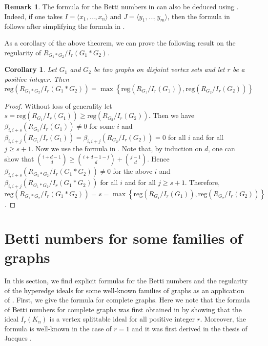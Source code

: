 \documentclass[12pt,reqno]{amsart}
\newtheorem{corollary}[proposition]{Corollary}
\theoremstyle{definition}
\newtheorem{remark}[proposition]{Remark}
\begin{document}
\begin{remark}
    The formula for the Betti numbers in  can also be deduced using \cite[Corollary 5.3]{Hugh}. Indeed, if one takes $I=\langle x_1,\ldots,x_n\rangle$ and $J=\langle y_1,\ldots,y_m\rangle$, then the formula in  follows after simplifying the formula in \cite[Corollary 5.3]{Hugh}.
\end{remark}

As a corollary of the above theorem, we can prove the following result on the regularity of $R_{G_1*G_2}/I_r(G_1*G_2)$.

\begin{corollary}\label{main corollary}
    Let $G_1$ and $G_2$ be two graphs on disjoint vertex sets and let $r$ be a positive integer. Then 
    \[
    \mathrm{reg}(R_{G_1*G_2}/I_r(G_1*G_2))=\max\left\{\mathrm{reg}(R_{G_1}/I_r(G_1)),\mathrm{reg}(R_{G_2}/I_r(G_2))\right\}
    \]
\end{corollary}

\begin{proof}
    Without loss of generality let $s=\mathrm{reg}(R_{G_1}/I_r(G_1))\ge \mathrm{reg}(R_{G_2}/I_r(G_2))$. Then we have $\beta_{i,i+s}(R_{G_1}/I_r(G_1))\neq 0$ for some $i$ and $\beta_{i,i+j}(R_{G_1}/I_r(G_1))=\beta_{i,i+j}(R_{G_2}/I_r(G_2))=0$ for all $i$ and for all $j\ge s+1$. Now we use the formula in . Note that, by induction on $d$, one can show that ${i+d-1\choose d}\ge {i+d-1-j\choose d}+{j-1\choose d}$. Hence $\beta_{i,i+s}(R_{G_1*G_2}/I_r(G_1*G_2))\neq 0$ for the above $i$ and $\beta_{i,i+j}(R_{G_1*G_2}/I_r(G_1*G_2))$ for all $i$ and for all $j\ge s+1$. Therefore, $\mathrm{reg}(R_{G_1*G_2}/I_r(G_1*G_2))=s=\max\left\{\mathrm{reg}(R_{G_1}/I_r(G_1)),\mathrm{reg}(R_{G_2}/I_r(G_2))\right\}$.
\end{proof}



\section{Betti numbers for some families of graphs}\label{Section 4}

In this section, we find explicit formulas for the Betti numbers and the regularity of the hyperedge ideals for some well-known families of graphs as an application of . First, we give the formula for complete graphs. Here we note that the formula of Betti numbers for complete graphs was first obtained in \cite[Theorem 4.4]{DRST} by showing that the ideal $I_r(K_n)$ is a vertex splittable ideal for all positive integer $r$. Moreover, the formula is well-known in the case of $r=1$ and it was first derived in the thesis of Jacques \cite[Theorem 5.1.1]{SJ}.
\end{document}

